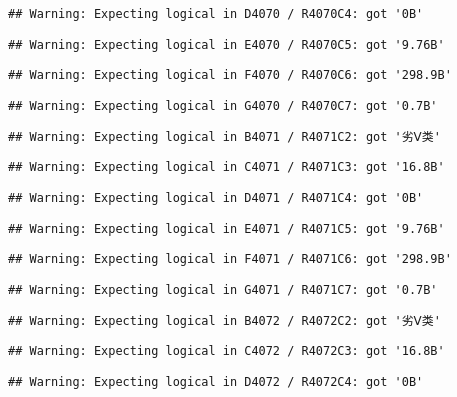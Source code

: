 \documentclass[
]{article}
\begin{document}
\begin{verbatim}
## Warning: Expecting logical in D4070 / R4070C4: got '0B'
\end{verbatim}

\begin{verbatim}
## Warning: Expecting logical in E4070 / R4070C5: got '9.76B'
\end{verbatim}

\begin{verbatim}
## Warning: Expecting logical in F4070 / R4070C6: got '298.9B'
\end{verbatim}

\begin{verbatim}
## Warning: Expecting logical in G4070 / R4070C7: got '0.7B'
\end{verbatim}

\begin{verbatim}
## Warning: Expecting logical in B4071 / R4071C2: got '劣Ⅴ类'
\end{verbatim}

\begin{verbatim}
## Warning: Expecting logical in C4071 / R4071C3: got '16.8B'
\end{verbatim}

\begin{verbatim}
## Warning: Expecting logical in D4071 / R4071C4: got '0B'
\end{verbatim}

\begin{verbatim}
## Warning: Expecting logical in E4071 / R4071C5: got '9.76B'
\end{verbatim}

\begin{verbatim}
## Warning: Expecting logical in F4071 / R4071C6: got '298.9B'
\end{verbatim}

\begin{verbatim}
## Warning: Expecting logical in G4071 / R4071C7: got '0.7B'
\end{verbatim}

\begin{verbatim}
## Warning: Expecting logical in B4072 / R4072C2: got '劣Ⅴ类'
\end{verbatim}

\begin{verbatim}
## Warning: Expecting logical in C4072 / R4072C3: got '16.8B'
\end{verbatim}

\begin{verbatim}
## Warning: Expecting logical in D4072 / R4072C4: got '0B'
\end{verbatim}
\end{document}
